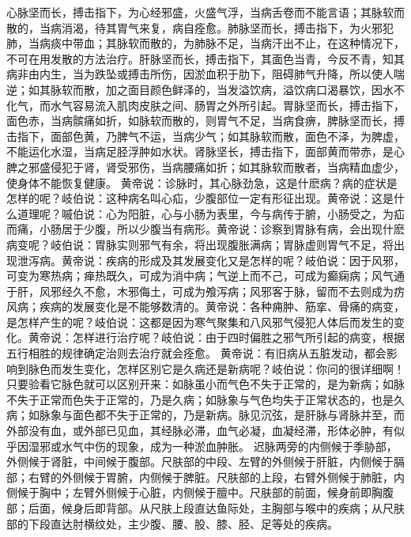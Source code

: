 \documentclass[a4paper,12pt,UTF8,twoside]{ctexbook}
\begin{document}
心脉坚而长，搏击指下，为心经邪盛，火盛气浮，当病舌卷而不能言语；其脉软而散的，当病消渴，待其胃气来复，病自痊愈。肺脉坚而长，搏击指下，为火邪犯肺，当病痰中带血；其脉软而散的，为肺脉不足，当病汗出不止，在这种情况下，不可在用发散的方法治疗。肝脉坚而长，搏击指下，其面色当青，今反不青，知其病非由内生，当为跌坠或搏击所伤，因淤血积于肋下，阻碍肺气升降，所以使人喘逆；如其脉软而散，加之面目颜色鲜泽的，当发溢饮病，溢饮病口渴暴饮，因水不化气，而水气容易流入肌肉皮肤之间、肠胃之外所引起。胃脉坚而长，搏击指下，面色赤，当病髌痛如折，如脉软而散的，则胃气不足，当病食痹，脾脉坚而长，搏击指下，面部色黄，乃脾气不运，当病少气；如其脉软而散，面色不泽，为脾虚，不能运化水湿，当病足胫浮肿如水状。肾脉坚长，搏击指下，面部黄而带赤，是心脾之邪盛侵犯于肾，肾受邪伤，当病腰痛如折；如其脉软而散者，当病精血虚少，使身体不能恢复健康。
黄帝说：诊脉时，其心脉劲急，这是什麽病？病的症状是怎样的呢？岐伯说：这种病名叫心疝，少腹部位一定有形征出现。黄帝说：这是什么道理呢？嘁伯说：心为阳脏，心与小肠为表里，今与病传于腑，小肠受之，为疝而痛，小肠居于少腹，所以少腹当有病形。黄帝说：诊察到胃脉有病，会出现什麽病变呢？岐伯说：胃脉实则邪气有余，将出现腹胀满病；胃脉虚则胃气不足，将出现泄泻病。黄帝说：疾病的形成及其发展变化又是怎样的呢？岐伯说：因于风邪，可变为寒热病；瘅热既久，可成为消中病；气逆上而不己，可成为癫痫病；风气通于肝，风邪经久不愈，木邪侮土，可成为飧泻病；风邪客于脉，留而不去则成为疠风病；疾病的发展变化是不能够数清的。黄帝说：各种痈肿、筋挛、骨痛的病变，是怎样产生的呢？岐伯说：这都是因为寒气聚集和八风邪气侵犯人体后而发生的变化。黄帝说：怎样进行治疗呢？岐伯说：由于四时偏胜之邪气所引起的病变，根据五行相胜的规律确定治则去治疗就会痊愈。
黄帝说：有旧病从五脏发动，都会影响到脉色而发生变化，怎样区别它是久病还是新病呢？岐伯说：你问的很详细啊！只要验看它脉色就可以区别开来：如脉虽小而气色不失于正常的，是为新病；如脉不失于正常而色失于正常的，乃是久病；如脉象与气色均失于正常状态的，也是久病；如脉象与面色都不失于正常的，乃是新病。脉见沉弦，是肝脉与肾脉并至，而外部没有血，或外部已见血，其经脉必滞，血气必凝，血凝经滞，形体必肿，有似乎因湿邪或水气中伤的现象，成为一种淤血肿胀。
迟脉两旁的内侧候于季胁部，外侧候于肾脏，中间候于腹部。尺肤部的中段、左臂的外侧候于肝脏，内侧候于膈部；右臂的外侧候于胃腑，内侧候于脾脏。尺肤部的上段，右臂外侧候于肺脏，内侧候于胸中；左臂外侧候于心脏，内侧候于膻中。尺肤部的前面，候身前即胸腹部；后面，候身后即背部。从尺肤上段直达鱼际处，主胸部与喉中的疾病；从尺肤部的下段直达肘横纹处，主少腹、腰、股、膝、胫、足等处的疾病。
\end{document}
